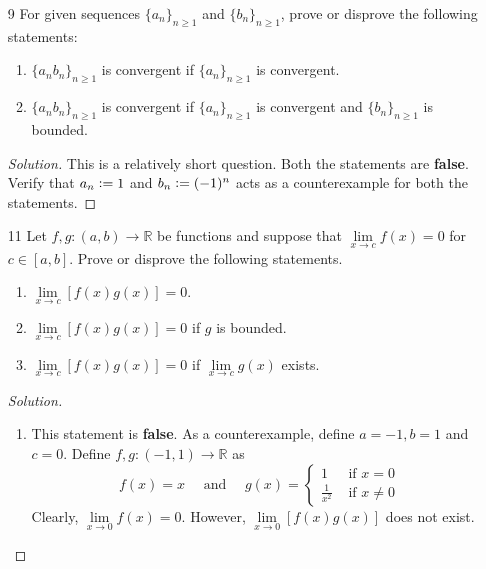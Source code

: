 \documentclass[12pt]{article}
\theoremstyle{definition}
\newenvironment{soln}{\begin{proof}[Solution]}{\end{proof}}
\begin{document}
\begin{enumerate}[leftmargin=*]
    \item[9] For given sequences $\{a_n\}_{n \geq 1}$ and $\{b_n\}_{n \geq 1}$, prove or disprove the following statements:
    \begin{enumerate}[label = (\roman*)]
        \item $\{a_n b_n\}_{n \geq 1}$ is convergent if $\{a_n\}_{n \geq 1}$ is convergent.
        \item $\{a_n b_n \}_{n \geq 1}$ is convergent if $\{a_n\}_{n \geq 1}$ is convergent and $\{b_n\}_{n \geq 1}$ is bounded.
    \end{enumerate}
    
    \begin{soln}
        This is a relatively short question. Both the statements are \textbf{false}. Verify that $a_n \vcentcolon= 1$ and $b_n \vcentcolon= (-1)^n$ acts as a counterexample for both the statements.
    \end{soln}
    
    \newpage
    
    \item[11] Let $f,g \colon (a,b) \to \mathbb{R}$ be functions and suppose that $\lim\limits_{x \to c} f(x) = 0$ for $c \in [a,b]$. Prove or disprove the following statements. 
    \begin{enumerate}[label = (\roman*)]
        \item $\lim\limits_{x \to c} \left[ f(x) g(x) \right] = 0$.
        \item $\lim\limits_{x \to c} \left[ f(x) g(x) \right] = 0$ if $g$ is bounded.
        \item $\lim\limits_{x \to c} \left[ f(x) g(x) \right] = 0$ if $\lim\limits_{x \to c} g(x)$ exists.
    \end{enumerate}
    \begin{soln}
    
        \begin{enumerate}[label = (\roman*), labelwidth=!, labelindent=0pt]
            \item This statement is \textbf{false}. As a counterexample, define $a=-1, b=1$ and $c=0$. Define $f,g \colon (-1,1) \to \mathbb{R}$ as
            \[
                f(x) = x \quad \text{ and } \quad g(x) = \begin{cases}
                    1 & \text{ if } x=0 \\
                    \frac{1}{x^2} & \text{ if } x \neq 0
                \end{cases}
            \]
            Clearly, $\lim\limits_{x \to 0} f(x) = 0$. However, $\lim\limits_{x \to 0} \left[ f(x) g(x) \right]$ does not exist.
            

\end{enumerate}
\end{soln}
\end{enumerate}
\end{document}
